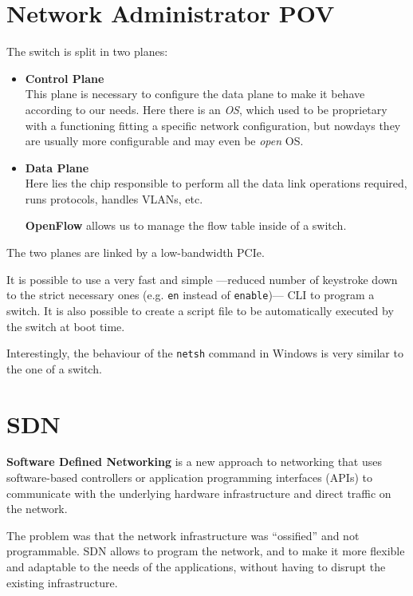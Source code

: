 \section{Network Administrator POV}
The switch is split in two planes:
\begin{itemize}
   \item \textbf{Control Plane}\\
   This plane is necessary to configure the data plane to make it behave according to our needs.
   Here there is an \textit{OS}, which used to be proprietary with a functioning fitting a specific network configuration, but nowdays they are usually more configurable and may even be \textit{open} OS.
   
   \item \textbf{Data Plane}\\
   Here lies the chip responsible to perform all the data link operations required, runs protocols, handles VLANs, etc.

   \textbf{OpenFlow} allows us to manage the flow table inside of a switch.
\end{itemize}

The two planes are linked by a low-bandwidth PCIe.


It is possible to use a very fast and simple ---reduced number of keystroke down to the strict necessary ones (e.g. \texttt{en} instead of \texttt{enable})--- CLI to program a switch. It is also possible to create a script file to be automatically executed by the switch at boot time.

Interestingly, the behaviour of the \texttt{netsh} command in Windows is very similar to the one of a switch.

\section{SDN}
\textbf{Software Defined Networking} is a new approach to networking that uses software-based controllers or application programming interfaces (APIs) to communicate with the underlying hardware infrastructure and direct traffic on the network.

The problem was that the network infrastructure was ``ossified'' and not programmable. SDN allows to program the network, and to make it more flexible and adaptable to the needs of the applications, without having to disrupt the existing infrastructure.

